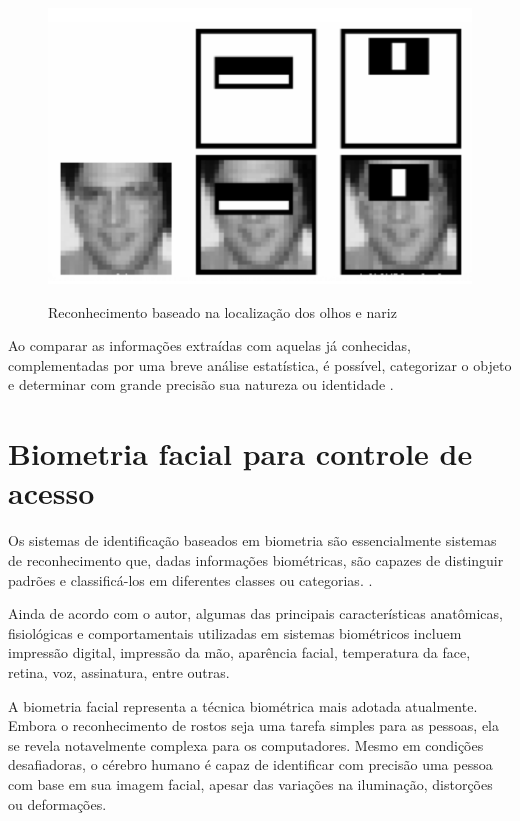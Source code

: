 \begin{figure}[h!]
    \centering
    \caption{Reconhecimento baseado na localização dos olhos e nariz}
    \includegraphics[scale=0.35]{figuras/haarcascate.png}
    \label{fig:haarcascate}
    \centering
\end{figure}

Ao comparar as informações extraídas com aquelas já conhecidas, 
complementadas por uma breve análise estatística, é possível,
categorizar o objeto e determinar com grande precisão sua natureza 
ou identidade \cite{gonzalez2010}.

\section{Biometria facial para controle de acesso}\label{sec:biometriaFacial}

Os sistemas de identificação baseados em biometria são essencialmente sistemas de 
reconhecimento que, dadas informações biométricas, são capazes de distinguir padrões e 
classificá-los em diferentes classes ou categorias. \cite{morais2010}.

Ainda de acordo com o autor, algumas das principais características anatômicas, 
fisiológicas e comportamentais utilizadas em sistemas biométricos incluem 
impressão digital, impressão da mão, aparência facial, temperatura da face, 
retina, voz, assinatura, entre outras.

A biometria facial representa a técnica biométrica mais adotada atualmente. 
Embora o reconhecimento de rostos seja uma tarefa simples para as 
pessoas, ela se revela notavelmente complexa para os computadores. 
Mesmo em condições desafiadoras, o cérebro humano é capaz de identificar 
com precisão uma pessoa com base em sua imagem facial, apesar das variações 
na iluminação, distorções ou deformações.

